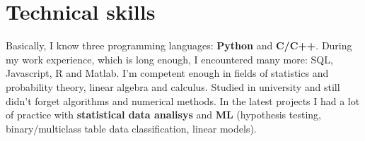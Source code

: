 \documentclass[12pt,a4paper,roman]{moderncv}
\begin{document}
\section{Technical skills}
\hspace{10mm}Basically, I know three programming languages: \textbf{Python} and \textbf{C/C++}.
During my work experience, which is long enough, I encountered many more: SQL, Javascript, R and Matlab. \newline
I'm competent enough in fields of statistics and probability theory, linear algebra and calculus.
Studied in university and still didn't forget algorithms and numerical methods. \newline
In the latest projects I had a lot of practice with \textbf{statistical data analisys} and \textbf{ML} (hypothesis testing, 
binary/multiclass table data classification, linear models). \newline
\end{document}

